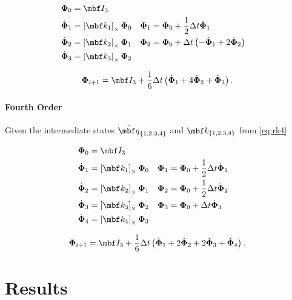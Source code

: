 \documentclass[10pt,a4paper]{article}
\newcommand{\mbs}[1]{{\boldsymbol{#1}}}
\numberwithin{equation}{section}
\begin{document}
\begin{align*}
\mbs \Phi_0 & = \mbf I_3 & \\
\dot{\mbs \Phi}_1 & = \left[\mbf k_1 \right]_\times \mbs \Phi_0 &
	\mbs \Phi_1 & = \mbs \Phi_0 + \dfrac{1}{2} \Delta t \dot{\mbs \Phi}_1 \\
\dot{\mbs \Phi}_2 & = \left[\mbf k_2 \right]_\times \mbs \Phi_1 &
	\mbs \Phi_2 & = \mbs \Phi_0 + \Delta t \left( - \dot{\mbs \Phi}_1 + 2 \dot{\mbs \Phi}_2  \right) \\
\dot{\mbs \Phi}_3 & = \left[\mbf k_3 \right]_\times \mbs \Phi_2
\end{align*}

\begin{equation}
\mbs \Phi_{i+1} = \mbf I_3 + \dfrac{1}{6} \Delta t \left(
	\dot{\mbs \Phi}_1 + 4 \dot{\mbs \Phi}_2 + \dot{\mbs \Phi}_3
\right).
\end{equation}


\paragraph{Fourth Order}

Given the intermediate states $\tilde{\mbf q}_{\lbrace 1, 2, 3, 4 \rbrace}$ and $\mbf k_{\lbrace 1, 2, 3, 4 \rbrace}$ from \eqref{eq:rk4}

\begin{align*}
\mbs \Phi_0 & = \mbf I_3 & \\
\dot{\mbs \Phi}_1 & = \left[\mbf k_1 \right]_\times \mbs \Phi_0 &
	\mbs \Phi_1 & = \mbs \Phi_0 + \dfrac{1}{2} \Delta t \dot{\mbs \Phi}_1 \\
\dot{\mbs \Phi}_2 & = \left[\mbf k_2 \right]_\times \mbs \Phi_1 &
	\mbs \Phi_2 & = \mbs \Phi_0 + \dfrac{1}{2} \Delta t \dot{\mbs \Phi}_2 \\
\dot{\mbs \Phi}_3 & = \left[\mbf k_3 \right]_\times \mbs \Phi_2 &
	\mbs \Phi_3 & = \mbs \Phi_0 + \Delta t \dot{\mbs \Phi}_3  \\
\dot{\mbs \Phi}_4 & = \left[\mbf k_4 \right]_\times \mbs \Phi_3
\end{align*}

\begin{equation}
\mbs \Phi_{i+1} = \mbf I_3 + \dfrac{1}{6} \Delta t \left(
	\dot{\mbs \Phi}_1 + 2 \dot{\mbs \Phi}_2 + 2 \dot{\mbs \Phi}_3 + \dot{\mbs \Phi}_4
\right).
\end{equation}


\section{Results}
\end{document}
